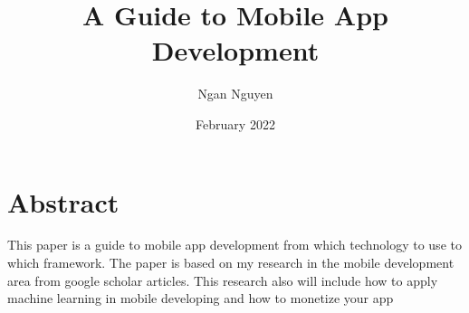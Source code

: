 \documentclass{article}
\title{ A Guide to Mobile App Development}
\author{Ngan Nguyen}
\date{February 2022}
\begin{document}
\maketitle

\section*{Abstract}
This paper is a guide to mobile app development from which technology to use to which framework. The paper is based on my research in the mobile development area from google scholar articles. This research also will include how to apply machine learning in mobile developing and how to monetize your app


\medskip



\newpage
\printbibliography
\end{document}
